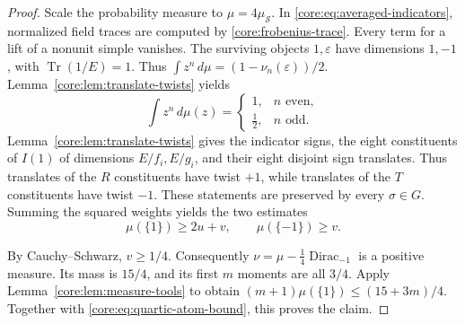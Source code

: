 \documentclass[11pt,a4paper]{article}
\theoremstyle{definition}\newtheorem{definition}[theorem]{Definition}
\theoremstyle{remark}\newtheorem{remark}[theorem]{Remark}
\DeclareMathOperator{\Tr}{Tr}
\numberwithin{equation}{section}
\begin{document}
\begin{proof}
Scale the probability measure to $\mu=4\mu_{\mathcal S}$.
In \eqref{core:eq:averaged-indicators}, normalized field traces are
computed by \eqref{core:frobenius-trace}. Every term for a lift of
a nonunit simple vanishes. The surviving objects $1,\varepsilon$
have dimensions $1,-1$, with $\Tr(1/E)=1$. Thus
$\int z^n\,d\mu=(1-\nu_n(\varepsilon))/2$.
Lemma~\ref{core:lem:translate-twists} yields
\begin{equation}\label{core:eq:quartic-constant-moments}
 \int z^n\,d\mu(z)=
 \begin{cases}1,&n\text{ even},\\[2pt]\tfrac12,&n\text{ odd}.
 \end{cases}
\end{equation}
Lemma~\ref{core:lem:translate-twists} gives the indicator signs,
the eight constituents of $I(1)$ of dimensions $E/f_i,E/g_i$,
and their eight disjoint sign translates.
Thus translates of the $R$ constituents have twist $+1$, while
translates of the $T$ constituents have twist $-1$.  These statements
are preserved by every $\sigma\in G$.  Summing the squared weights
yields the two estimates
\begin{equation}\label{core:eq:quartic-atom-bound}
 \mu(\{1\})\ge 2u+v,\qquad \mu(\{-1\})\ge v.
\end{equation}

By Cauchy--Schwarz, $v\ge1/4$.  Consequently
$\nu=\mu-\tfrac14\operatorname{Dirac}_{-1}$ is a positive measure.
Its mass is $15/4$, and its first $m$ moments are all $3/4$.
Apply Lemma~\ref{core:lem:measure-tools} to obtain
$(m+1)\mu(\{1\})\le(15+3m)/4$. Together with
\eqref{core:eq:quartic-atom-bound}, this proves the claim.
\end{proof}
\end{document}
